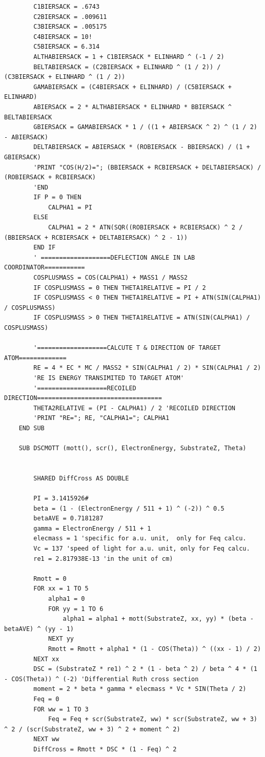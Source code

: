\documentclass[10pt, reqno]{exam}
\begin{document}
\begin{verbatim}
        C1BIERSACK = .6743
        C2BIERSACK = .009611
        C3BIERSACK = .005175
        C4BIERSACK = 10!
        C5BIERSACK = 6.314
        ALTHABIERSACK = 1 + C1BIERSACK * ELINHARD ^ (-1 / 2)
        BELTABIERSACK = (C2BIERSACK + ELINHARD ^ (1 / 2)) / (C3BIERSACK + ELINHARD ^ (1 / 2))
        GAMABIERSACK = (C4BIERSACK + ELINHARD) / (C5BIERSACK + ELINHARD)
        ABIERSACK = 2 * ALTHABIERSACK * ELINHARD * BBIERSACK ^ BELTABIERSACK
        GBIERSACK = GAMABIERSACK * 1 / ((1 + ABIERSACK ^ 2) ^ (1 / 2) - ABIERSACK)
        DELTABIERSACK = ABIERSACK * (ROBIERSACK - BBIERSACK) / (1 + GBIERSACK)
        'PRINT "COS(H/2)="; (BBIERSACK + RCBIERSACK + DELTABIERSACK) / (ROBIERSACK + RCBIERSACK)
        'END
        IF P = 0 THEN
            CALPHA1 = PI
        ELSE
            CALPHA1 = 2 * ATN(SQR((ROBIERSACK + RCBIERSACK) ^ 2 / (BBIERSACK + RCBIERSACK + DELTABIERSACK) ^ 2 - 1))
        END IF
        ' ===================DEFLECTION ANGLE IN LAB COORDINATOR===========
        COSPLUSMASS = COS(CALPHA1) + MASS1 / MASS2
        IF COSPLUSMASS = 0 THEN THETA1RELATIVE = PI / 2
        IF COSPLUSMASS < 0 THEN THETA1RELATIVE = PI + ATN(SIN(CALPHA1) / COSPLUSMASS)
        IF COSPLUSMASS > 0 THEN THETA1RELATIVE = ATN(SIN(CALPHA1) / COSPLUSMASS)
    
        '===================CALCUTE T & DIRECTION OF TARGET ATOM=============
        RE = 4 * EC * MC / MASS2 * SIN(CALPHA1 / 2) * SIN(CALPHA1 / 2)
        'RE IS ENERGY TRANSIMITED TO TARGET ATOM'
        '===================RECOILED DIRECTION==================================
        THETA2RELATIVE = (PI - CALPHA1) / 2 'RECOILED DIRECTION
        'PRINT "RE="; RE, "CALPHA1="; CALPHA1
    END SUB
    
    SUB DSCMOTT (mott(), scr(), ElectronEnergy, SubstrateZ, Theta)
    
    
        SHARED DiffCross AS DOUBLE
    
        PI = 3.1415926#
        beta = (1 - (ElectronEnergy / 511 + 1) ^ (-2)) ^ 0.5
        betaAVE = 0.7181287
        gamma = ElectronEnergy / 511 + 1
        elecmass = 1 'specific for a.u. unit,  only for Feq calcu.
        Vc = 137 'speed of light for a.u. unit, only for Feq calcu.
        re1 = 2.817938E-13 'in the unit of cm)
    
        Rmott = 0
        FOR xx = 1 TO 5
            alpha1 = 0
            FOR yy = 1 TO 6
                alpha1 = alpha1 + mott(SubstrateZ, xx, yy) * (beta - betaAVE) ^ (yy - 1)
            NEXT yy
            Rmott = Rmott + alpha1 * (1 - COS(Theta)) ^ ((xx - 1) / 2)
        NEXT xx
        DSC = (SubstrateZ * re1) ^ 2 * (1 - beta ^ 2) / beta ^ 4 * (1 - COS(Theta)) ^ (-2) 'Differential Ruth cross section
        moment = 2 * beta * gamma * elecmass * Vc * SIN(Theta / 2)
        Feq = 0
        FOR ww = 1 TO 3
            Feq = Feq + scr(SubstrateZ, ww) * scr(SubstrateZ, ww + 3) ^ 2 / (scr(SubstrateZ, ww + 3) ^ 2 + moment ^ 2)
        NEXT ww
        DiffCross = Rmott * DSC * (1 - Feq) ^ 2
    

\end{verbatim}
\end{document}
